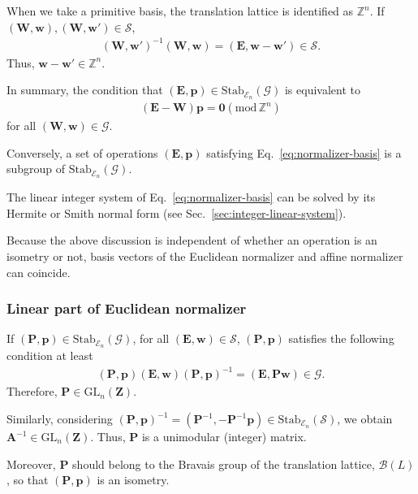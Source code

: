 When we take a primitive basis, the translation lattice is identified as $\mathbb{Z}^{n}$.
If $(\bm{W}, \bm{w} ), (\bm{W}, \bm{w}') \in \mathcal{S}$,
\begin{align}
  (\bm{W}, \bm{w}')^{-1} (\bm{W}, \bm{w}) = (\bm{E}, \bm{w} - \bm{w}' ) \in \mathcal{S}.
\end{align}
Thus, $\mathbf{w} - \mathbf{w}' \in \mathbb{Z}^{n}$.

In summary, the condition that $(\bm{E}, \bm{p} ) \in \mathrm{Stab}_{\mathcal{E}_{n}}(\mathcal{G})$ is equivalent to
\begin{align}
  \label{eq:normalizer-basis}
  (\bm{E} - \bm{W} ) \bm{p} = \bm{0} ( \mathrm{mod} \, \mathbb{Z}^{n} )
\end{align}
for all $(\bm{W}, \bm{w}) \in \mathcal{G}$.

Conversely, a set of operations $(\bm{E}, \bm{p})$ satisfying Eq.~\eqref{eq:normalizer-basis} is a subgroup of $\mathrm{Stab}_{\mathcal{E}_{n}}(\mathcal{G})$.

The linear integer system of Eq.~\eqref{eq:normalizer-basis} can be solved by its Hermite or Smith normal form (see Sec.~\ref{sec:integer-linear-system}).

Because the above discussion is independent of whether an operation is an isometry or not, basis vectors of the Euclidean normalizer and affine normalizer can coincide.

\subsubsection{Linear part of Euclidean normalizer}
If $(\bm{P}, \bm{p} ) \in \mathrm{Stab}_{\mathcal{E}_{n}}(\mathcal{G})$, for all $(\bm{E}, \bm{w}) \in \mathcal{S}$, $(\bm{P}, \bm{p})$ satisfies the following condition at least
\begin{align}
  (\bm{P}, \bm{p}) (\bm{E}, \bm{w}) (\bm{P}, \bm{p})^{-1} = (\bm{E}, \bm{Pw}) \in \mathcal{G}.
\end{align}
Therefore, $\bm{P} \in \mathrm{GL}_{n}(\mathbf{Z})$.

Similarly, considering $(\bm{P}, \bm{p} )^{-1} = (\bm{P}^{-1}, -\bm{P}^{-1}\bm{p} ) \in \mathrm{Stab}_{\mathcal{E}_{n}}(\mathcal{S})$, we obtain $\bm{A}^{-1} \in \mathrm{GL}_{n}(\mathbf{Z})$.
Thus, $\bm{P}$ is a unimodular (integer) matrix.

Moreover, $\bm{P}$ should belong to the Bravais group of the translation lattice, $\mathcal{B}(L)$, so that $(\bm{P}, \bm{p} )$ is an isometry.

